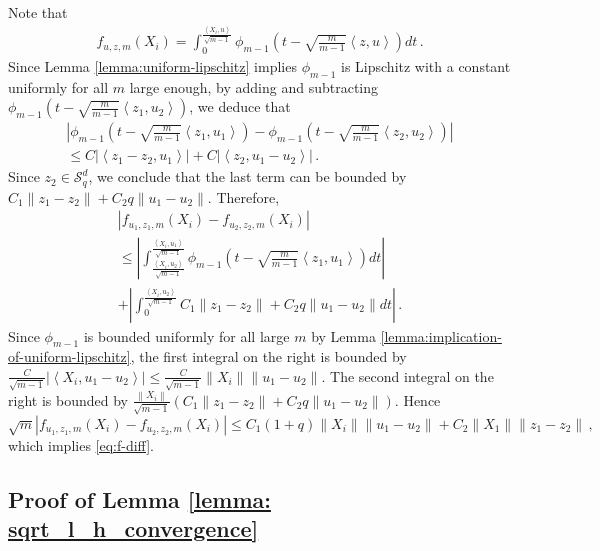 \documentclass[12pt]{article}
\def\l{\left}
\def\r{\right}
\newcommand{\dotp}[2]{\left\langle#1,#2\right\rangle}
\theoremstyle{thmstyletwo}%
\theoremstyle{thmstylethree}%
\begin{document}
Note that
\begin{align*}
    f_{u,z,m}(X_i) = \int_{0}^{\frac{\dotp{X_i}{u}}{\sqrt{m-1}}} \phi_{m-1}\l(t - \sqrt{\frac{m}{m-1}}\dotp{z}{u}\r)  dt \,.
\end{align*}
Since Lemma \ref{lemma:uniform-lipschitz} implies $\phi_{m-1}$ is Lipschitz with a constant uniformly for all $m$ large enough, by adding and subtracting $\phi_{m-1}\l(t - \sqrt{\frac{m}{m-1}}\dotp{z_1}{u_2}\r)$, we deduce that
\begin{multline*}
    \l\lvert \phi_{m-1}\l(t - \sqrt{\frac{m}{m-1}}\dotp{z_1}{u_1}\r) - \phi_{m-1}\l(t - \sqrt{\frac{m}{m-1}}\dotp{z_2}{u_2}\r) \r\rvert \\
    \leq C \l\lvert \dotp{z_1 - z_2}{u_1} \r\rvert + C \l\lvert \dotp{z_2}{u_1 - u_2} \r\rvert \,.
\end{multline*}
Since $z_2 \in \mathcal{S}^d_q$, we conclude that the last term can be bounded by $C_1 \|z_1 - z_2\| + C_2 q \|u_1 - u_2\|$. Therefore,
\begin{multline*}
    \l\lvert f_{u_1,z_1,m}(X_i) - f_{u_2,z_2,m}(X_i) \r\rvert \\
    \leq \l\lvert \int^{\frac{\dotp{X_i}{u_1}}{\sqrt{m-1}}}_{\frac{\dotp{X_i}{u_2}}{\sqrt{m-1}}} \phi_{m-1}\l(t - \sqrt{\frac{m}{m-1}}\dotp{z_1}{u_1}\r) dt \r\rvert \\
    + \l\lvert \int_0^{\frac{\dotp{X_i}{u_2}}{\sqrt{m-1}}} C_1 \|z_1 - z_2\| + C_2 q \|u_1 - u_2\| dt \r\rvert \,.
\end{multline*}
Since $\phi_{m-1}$ is bounded uniformly for all large $m$ by Lemma \ref{lemma:implication-of-uniform-lipschitz}, the first integral on the right is bounded by $\frac{C}{\sqrt{m-1}}\l\lvert \dotp{X_i}{u_1-u_2} \r\rvert \leq \frac{C}{\sqrt{m-1}}\l\| X_i\r\| \|u_1 - u_2\|$. The second integral on the right is bounded by $\frac{\l\| X_i\r\|}{\sqrt{m-1}}\l(C_1 \|z_1 - z_2\| + C_2 q \|u_1 - u_2\|\r)$. Hence
\begin{equation*}
     \sqrt{m}\l\lvert f_{u_1,z_1,m}(X_i) - f_{u_2,z_2,m}(X_i) \r\rvert 
     \leq C_1(1+q)\|X_i\| \|u_1 - u_2\| + C_2\|X_1\| \|z_1 - z_2\| \,,
\end{equation*}
which implies \eqref{eq:f-diff}.


\subsection{Proof of Lemma \ref{lemma: sqrt_l_h_convergence}}
\end{document}
